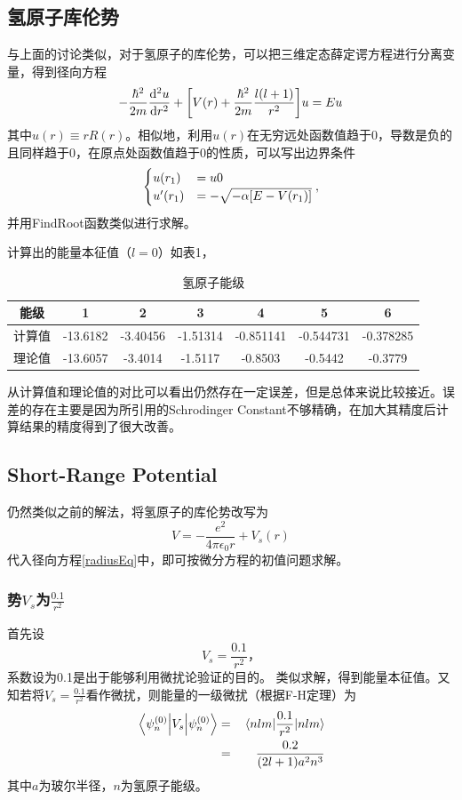 \documentclass{ctexart}
\begin{document}
\subsection{氢原子库伦势}
与上面的讨论类似，对于氢原子的库伦势，可以把三维定态薛定谔方程进行分离变量，得到径向方程
\begin{equation}\label{radiusEq}
  -\frac{\hbar^2}{2m}\dv[2]{u}{r}+\bqty{V(r)+\frac{\hbar^2}{2m}\frac{l(l+1)}{r^2}}u=Eu
\end{equation}
其中$u(r)\equiv rR(r)$。相似地，利用$u(r)$在无穷远处函数值趋于0，导数是负的且同样趋于0，在原点处函数值趋于0的性质，可以写出边界条件
\begin{equation*}
\begin{cases}
u(r_1)&=u0\\
u'(r_1)&=-\sqrt{-\alpha\bqty{E-V(r_1)}}
\end{cases}
,
\end{equation*}
并用FindRoot函数类似进行求解。

计算出的能量本征值（$l=0$）如表1，
\begin{table}[!htdp]
  \centering
  \begin{tabular}{|c|c|c|c|c|c|c|}
    \hline
    能级 & 1 & 2 & 3 & 4 & 5 & 6 \\
    \hline
    计算值 & -13.6182 & -3.40456 & -1.51314 & -0.851141 & -0.544731 & -0.378285\\
    \hline
    理论值 & -13.6057 & -3.4014 & -1.5117 & -0.8503 & -0.5442 & -0.3779 \\
    \hline
  \end{tabular}
  \caption{氢原子能级}\label{}
\end{table}
从计算值和理论值的对比可以看出仍然存在一定误差，但是总体来说比较接近。误差的存在主要是因为所引用的Schrodinger Constant不够精确，在加大其精度后计算结果的精度得到了很大改善。

\subsection{Short-Range Potential}
仍然类似之前的解法，将氢原子的库伦势改写为
\begin{equation}\label{Vs}
  V=-\frac{e^2}{4\pi \epsilon_0 r}+V_s(r)
\end{equation}
代入径向方程\eqref{radiusEq}中，即可按微分方程的初值问题求解。
\subsubsection{势$V_s$为$\displaystyle\frac{0.1}{r^2}$}
首先设
\begin{equation}
V_s=\frac{0.1}{r^2}，
\end{equation}
系数设为0.1是出于能够利用微扰论验证的目的。
类似求解，得到能量本征值。又知若将$\displaystyle V_s=\frac{0.1}{r^2}$看作微扰，则能量的一级微扰（根据F-H定理）为
\begin{eqnarray*}
\ev{V_s}{\psi_n^{(0)}} &=& \mel{nlm}{\frac{0.1}{r^2}}{nlm} \\
   &=& \frac{0.2}{(2l+1)a^2n^3}
\end{eqnarray*}\label{}
其中$a$为玻尔半径，$n$为氢原子能级。
\end{document}
